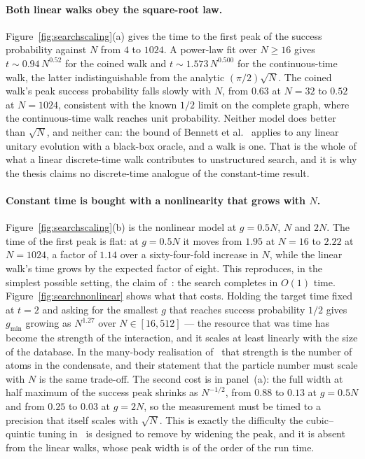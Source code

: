 \paragraph*{Both linear walks obey the square-root law.}
Figure~\ref{fig:searchscaling}(a) gives the time to the first peak of the
success probability against $N$ from $4$ to $1024$. A power-law fit over
$N \geq 16$ gives $t \sim 0.94\,N^{0.52}$ for the coined walk and
$t \sim 1.573\,N^{0.500}$ for the continuous-time walk, the latter
indistinguishable from the analytic $(\pi/2)\sqrt{N}$. The coined walk's peak
success probability falls slowly with $N$, from $0.63$ at $N=32$ to $0.52$ at
$N = 1024$, consistent with the known $1/2$ limit on the complete graph, where
the continuous-time walk reaches unit probability. Neither model does better
than $\sqrt{N}$, and neither can: the bound of Bennett et
al.~\cite{Bennett_1997} applies to any linear unitary evolution with a
black-box oracle, and a walk is one. That is the whole of what a linear
discrete-time walk contributes to unstructured search, and it is why the
thesis claims no discrete-time analogue of the constant-time result.

\paragraph*{Constant time is bought with a nonlinearity that grows with $N$.}
Figure~\ref{fig:searchscaling}(b) is the nonlinear model at $g = 0.5N$, $N$
and $2N$. The time of the first peak is flat: at $g = 0.5N$ it moves from
$1.95$ at $N = 16$ to $2.22$ at $N = 1024$, a factor of $1.14$ over a
sixty-four-fold increase in $N$, while the linear walk's time grows by the
expected factor of eight. This reproduces, in the simplest possible setting,
the claim of~\cite{DalFavero_2024}: the search completes in $O(1)$ time.
Figure~\ref{fig:searchnonlinear} shows what that costs. Holding the target
time fixed at $t = 2$ and asking for the smallest $g$ that reaches success
probability $1/2$ gives $g_{\min}$ growing as $N^{1.27}$ over $N \in [16,
512]$ --- the resource that was time has become the strength of the
interaction, and it scales at least linearly with the size of the database.
In the many-body realisation of~\cite{DalFavero_2024} that strength is the
number of atoms in the condensate, and their statement that the particle
number must scale with $N$ is the same trade-off. The second cost is in
panel~(a): the full width at half maximum of the success peak shrinks as
$N^{-1/2}$, from $0.88$ to $0.13$ at $g = 0.5N$ and from $0.25$ to $0.03$ at
$g = 2N$, so the measurement must be timed to a precision that itself scales
with $\sqrt{N}$. This is exactly the difficulty the cubic--quintic tuning
in~\cite{DalFavero_2024} is designed to remove by widening the peak, and it is
absent from the linear walks, whose peak width is of the order of the run time.


